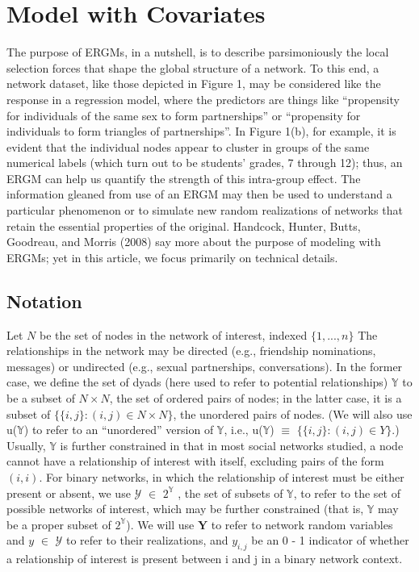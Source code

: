 \documentclass[12pt]{ociamthesis}  %
\begin{document}
	\chapter{Model with Covariates}
	
	The purpose of ERGMs, in a nutshell, is to describe parsimoniously the local selection forces
	that shape the global structure of a network. To this end, a network dataset, like those
	depicted in Figure 1, may be considered like the response in a regression model, where the
	predictors are things like “propensity for individuals of the same sex to form partnerships” or
	“propensity for individuals to form triangles of partnerships”. In Figure 1(b), for example, it
	is evident that the individual nodes appear to cluster in groups of the same numerical labels
	(which turn out to be students’ grades, 7 through 12); thus, an ERGM can help us quantify
	the strength of this intra-group effect. The information gleaned from use of an ERGM may
	then be used to understand a particular phenomenon or to simulate new random realizations
	of networks that retain the essential properties of the original. Handcock, Hunter, Butts,
	Goodreau, and Morris (2008) say more about the purpose of modeling with ERGMs; yet in
	this article, we focus primarily on technical details.
	
	\section{Notation}
	Let $N$ be the set of nodes in the network of interest, indexed $\{ 1,...,n\}$ The relationships in
	the network may be directed (e.g., friendship nominations, messages) or undirected (e.g., sexual
	partnerships, conversations). In the former case, we define the set of dyads (here used to refer
	to potential relationships) $\mathbb{Y}$ to be a subset of $N \times N$, the set of ordered pairs of nodes; in the
	latter case, it is a subset of $\{ \{i, j\} : (i, j) \in N \times N\}$, the unordered pairs of nodes. (We will also
	use u($\mathbb{Y}$) to refer to an “unordered” version of $\mathbb{Y}$, i.e., u($\mathbb{Y}$) $\equiv$ $\{\{i, j\} : (i, j) \in Y \}$.) Usually, $\mathbb{Y}$ is
	further constrained in that in most social networks studied, a node cannot have a relationship of
	interest with itself, excluding pairs of the form $(i, i)$.
	For binary networks, in which the relationship of interest must be either present or absent,
	we use $\mathcal{Y}$ $\in$ $2^{\mathbb{Y}}$
	, the set of subsets of $\mathbb{Y}$, to refer to the set of possible networks of interest, which may be further constrained (that is, $\mathbb{Y}$ may be a proper subset of $2^{\mathbb{Y}}$). We will use $\textbf{Y}$ to refer to
	network random variables and $y$ $\in$ $\mathcal{Y}$ to refer to their realizations, and $y_{i,j}$ be an 0 - 1 indicator of
	whether a relationship of interest is present between i and j in a binary network context.
	
\end{document}
